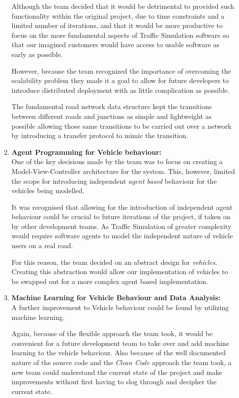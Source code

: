 \documentclass[11pt]{article}
\begin{document}
\begin{enumerate}
\begin{enumerate}
	Although the team decided that it would be detrimental to provided such functionality within the original project, due to time constraints and a limited number of iterations, and that it would be more productive to focus on the more fundamental aspects of Traffic Simulation software so that our imagined customers would have access to usable software as early as possible.
	
	However, because the team recognized the importance of overcoming the scalability problem they made it a goal to allow for future developers to introduce distributed deployment with as little complication as possible.
	
	The fundamental road network data structure kept the transitions between different roads and junctions as simple and lightweight as possible allowing those same transitions to be carried out over a network by introducing a transfer protocol to mimic the transition.\\
	
	\item \textbf{Agent Programming for Vehicle behaviour:}
	\\
	
	One of the key decisions made by the team was to focus on creating a Model-View-Controller architecture for the system. This, however, limited the scope for introducing independent \textit{agent based} behaviour for the vehicles being modelled.
	
	It was recognised that allowing for the introduction of independent agent behaviour could be crucial to future iterations of the project, if taken on by other development teams. As Traffic Simulation of greater complexity would require software agents to model the independent nature of vehicle users on a real road.
	
	For this reason, the team decided on an abstract design for \textit{vehicles}. Creating this abstraction would allow our implementation of vehicles to be swapped out for a more complex agent based implementation.\\
	
	\item \textbf{Machine Learning for Vehicle Behaviour and Data Analysis:}
	\\
	
	A further improvement to Vehicle behaviour could be found by utilizing machine learning.
	
	Again, because of the flexible approach the team took, it would be convenient for a future development team to take over and add machine learning to the vehicle behaviour. Also because of the well documented nature of the source code and the \textit{Clean Code} \cite{MartinRC08} approach the team took, a new team could understand the current state of the project and make improvements without first having to slog through and decipher the current state.
	

\end{enumerate}
\end{enumerate}
\end{document}
